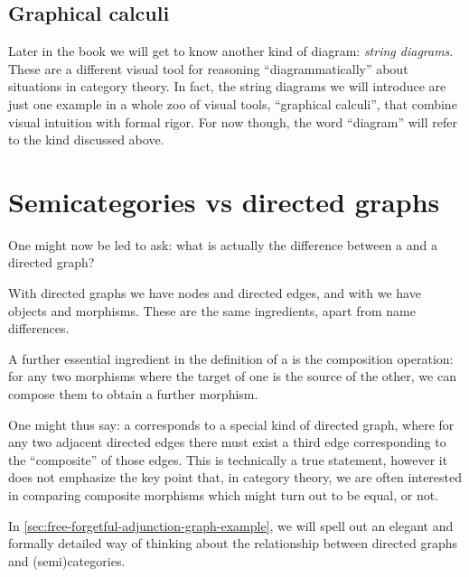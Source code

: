 
\subsection{Graphical calculi}

Later in the book we will get to know another kind of diagram: \emph{string diagrams}.
These are a different visual tool for reasoning ``diagrammatically'' about situations in category theory.
In fact, the string diagrams we will introduce are just one example in a whole zoo of visual tools, ``graphical calculi'', that combine visual intuition with formal rigor.
For now though, the word ``diagram'' will refer to the kind discussed above.


\section[Categories vs graphs]{Semicategories vs directed graphs}

One might now be led to ask: what is actually the difference between a  and a directed graph?

With directed graphs we have nodes and directed edges, and with  we have objects and morphisms.
These are the same ingredients, apart from name differences.

A further essential ingredient in the definition of a  is the composition operation: for any two morphisms where the target of one is the source of the other, we can compose them to obtain a further morphism.

One might thus say: a  corresponds to a special kind of directed graph, where for any two adjacent directed edges there must exist a third edge corresponding to the ``composite'' of those edges.
This is technically a true statement, however it does not emphasize the key point that, in category theory, we are often interested in comparing composite morphisms which might turn out to be equal, or not.

In \cref{sec:free-forgetful-adjunction-graph-example}, we will spell out an elegant and formally detailed way of thinking about the relationship between directed graphs and (semi)categories.
